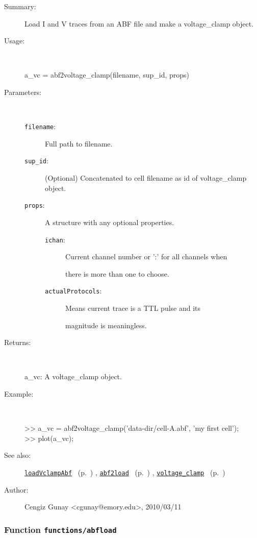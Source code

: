 \begin{description}
\item[Summary:]Load I and V traces from an ABF file and make a voltage\_clamp object.
%
\item[Usage:]~%
\begin{lyxcode}%
a\_vc = abf2voltage\_clamp(filename, sup\_id, props)
%
\end{lyxcode}%
%
%
\item[Parameters:]~
\begin{description}%
\item[\texttt{filename}:]
 Full path to filename.
\item[\texttt{sup\_id}:]
 (Optional) Concatenated to cell filename as id of voltage\_clamp object.
\item[\texttt{props}:]
 A structure with any optional properties.
\begin{description}%
\item[\texttt{ichan}:]
 Current channel number or ':' for all channels when

there is more than one  to choose.
\item[\texttt{actualProtocols}:]
 Means current trace is a TTL pulse and its

magnitude is meaningless.
\end{description}%
\end{description}%
%
\item[Returns:
]~

   a\_vc: A voltage\_clamp object.
%
\item[Example:]~
\begin{lyxcode} >> a\_vc = abf2voltage\_clamp('data-dir/cell-A.abf', 'my first cell');
\\%
 >> plot(a\_vc);
\\%
\end{lyxcode}
%
\item[See also:]%
\hyperlink{ref_loadVclampAbf}{\texttt{loadVclampAbf}}%
\ (p.~\pageref{ref_loadVclampAbf})%
%
, \hyperlink{ref_abf2load}{\texttt{abf2load}}%
\ (p.~\pageref{ref_abf2load})%
%
, \hyperlink{ref_voltage_clamp}{\texttt{voltage\_clamp}}%
\ (p.~\pageref{ref_voltage_clamp})%
%
%
\item[Author:]%
Cengiz Gunay <cgunay@emory.edu>, 2010/03/11
%
\end{description}
\methodline%
\subsubsection[Function \texttt{abfload}]{Function \texttt{functions/abfload}}%
%
\label{ref_functions__abfload}%
\hypertarget{ref_functions__abfload}{}%
\begin{description}
%
%
%
%
%
%
%
%
\end{description}
\methodline%

